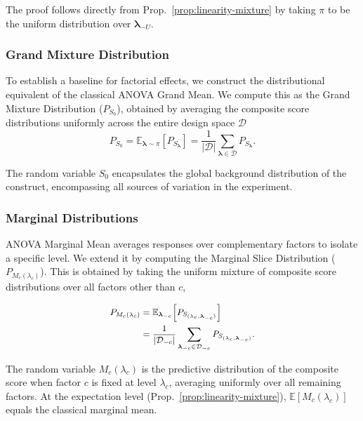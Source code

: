 The proof follows directly from Prop.~\ref{prop:linearity-mixture}
by taking $\pi$ to be the uniform distribution over
$\boldsymbol{\lambda}_{-U}$.


\subsubsection{Grand Mixture Distribution}

To establish a baseline for factorial effects, we construct the distributional equivalent of the classical ANOVA Grand Mean. We compute this as the Grand Mixture Distribution ($P_{S_0}$), obtained by averaging the composite score distributions uniformly across the entire design space $\mathcal{D}$
\begin{equation}
\label{eq:grand-mixture}
P_{S_0}
=
\mathbb{E}_{\boldsymbol{\lambda} \sim \pi}
\!\left[
P_{S_{\boldsymbol{\lambda}}}
\right]
=
\frac{1}{|\mathcal{D}|}
\sum_{\boldsymbol{\lambda} \in \mathcal{D}}
P_{S_{\boldsymbol{\lambda}}}.  
\end{equation}


The random variable \(S_0\) encapsulates the global background distribution of the construct, encompassing all sources of variation in the experiment.



\subsubsection{Marginal Distributions}
\label{app:marginal-slices}

ANOVA Marginal Mean averages responses over complementary factors to isolate a specific level. We extend it by computing the Marginal Slice Distribution ($P_{M_c(\lambda_c)}$). This is obtained by taking the uniform mixture of composite score distributions over all factors other than $c$,

{\small
\begin{equation}
\label{eq:marginal-means}
\small
\begin{split}
P_{M_c(\lambda_c)}&=\mathbb{E}_{\boldsymbol{\lambda}_{-c}}\!\left[P_{S_{(\lambda_c,\boldsymbol{\lambda}_{-c})}}\right]\\
                  &=\frac{1}{|\mathcal{D}_{-c}|}\sum_{\boldsymbol{\lambda}_{-c}\in\mathcal{D}_{-c}}P_{S_{(\lambda_c,\boldsymbol{\lambda}_{-c})}}.
\end{split}
\end{equation}
}

The random variable \(M_c(\lambda_c)\) is the predictive distribution of the
composite score when factor \(c\) is fixed at level \(\lambda_c\), averaging
uniformly over all remaining factors. 
At the expectation level (Prop.~\ref{prop:linearity-mixture}),
\(\mathbb{E}[M_c(\lambda_c)]\) equals the classical marginal mean.

